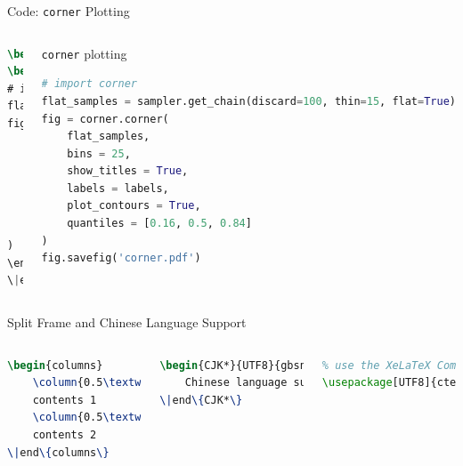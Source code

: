 \documentclass{beamer}
\begin{document}
\begin{frame}[fragile,t,label=listing]{Code: \texttt{corner} Plotting}
    \begin{columns}[t]
\begin{lstlisting}[language=TeX]
% \begin{frame}[fragile]
\begin{block}{\texttt{corner} plotting}
\begin{lstlisting}[language=Python]
# import corner
flat_samples = sampler.get_chain(discard=100, thin=15, flat=True)
fig = corner.corner(
    flat_samples,
    bins = 25,
    show_titles = True,
    labels = labels,
    plot_contours = True,
    quantiles = [0.16, 0.5, 0.84]
)
\end{block}
\|end\{lstlisting\}
\end{lstlisting}
        \begin{block}{\texttt{corner} plotting}
\begin{lstlisting}[language=Python]
# import corner
flat_samples = sampler.get_chain(discard=100, thin=15, flat=True)
fig = corner.corner(
    flat_samples,
    bins = 25,
    show_titles = True,
    labels = labels,
    plot_contours = True,
    quantiles = [0.16, 0.5, 0.84]
)
fig.savefig('corner.pdf')
\end{lstlisting}
        \end{block}
    \end{columns}
\end{frame}

\begin{frame}[fragile,label=splitandchinese]{Split Frame and Chinese Language Support}
    \begin{columns}
\begin{lstlisting}[language=TeX,caption=split the frame]
\begin{columns}
    \column{0.5\textwidth}
    contents 1
    \column{0.5\textwidth}
    contents 2
\|end\{columns\}
\end{lstlisting}
\begin{lstlisting}[language=TeX,caption=Chinese language support 1]
\begin{CJK*}{UTF8}{gbsn}
    Chinese language support
\|end\{CJK*\}
\end{lstlisting}
\begin{lstlisting}[language=TeX,caption=Chinese language support 2]
% wirte it at document preamble
% use the XeLaTeX Compiler
\usepackage[UTF8]{ctex}
\end{lstlisting}
    \end{columns}
\end{frame}
\end{document}
